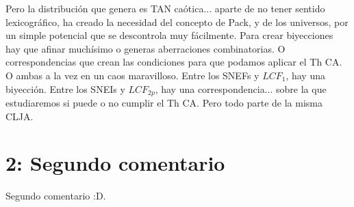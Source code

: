Pero la distribución que genera es TAN caótica... aparte de no tener sentido lexicográfico, ha creado la necesidad del concepto de Pack, y de los universos, por un simple potencial que se descontrola muy fácilmente. Para crear biyecciones hay que afinar muchísimo o generas aberraciones combinatorias. O correspondencias que crean las condiciones para que podamos aplicar el Th CA. O ambas a la vez en un caos maravilloso. Entre los SNEFs y $LCF_{1}$, hay una biyección. Entre los SNEIs y $LCF_{2p}$, hay una correspondencia... sobre la que estudiaremos si puede o no cumplir el Th CA. Pero todo parte de la misma CLJA.   

\newpage

\section {2: Segundo comentario}

Segundo comentario :D.

\newpage